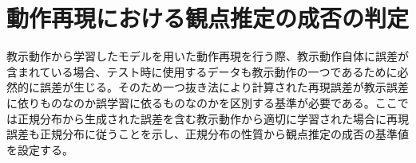 ﻿\appendix
\chapter{動作再現における観点推定の成否の判定}\label{appendix1}

教示動作から学習したモデルを用いた動作再現を行う際、教示動作自体に誤差が含まれている場合、テスト時に使用するデータも教示動作の一つであるために必然的に誤差が生じる。そのため一つ抜き法により計算された再現誤差が教示誤差に依りものなのか誤学習に依るものなのかを区別する基準が必要である。ここでは正規分布から生成された誤差を含む教示動作から適切に学習された場合に再現誤差も正規分布に従うことを示し、正規分布の性質から観点推定の成否の基準値を設定する。



